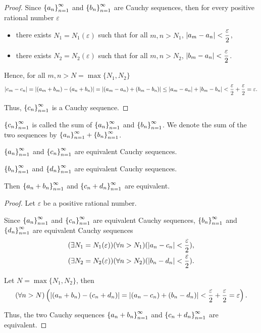 \begin{proof}
    Since ${\left\{{a_{n}}\right\}}^{\infty}_{n=1}$ and ${\left\{{b_{n}}\right\}}^{\infty}_{n=1}$ are Cauchy sequences, then for every positive rational number $\varepsilon$
    \begin{itemize}[itemsep=0pt]
        \item there exists $N_{1} = N_{1}(\varepsilon)$ such that for all $m, n > N_{1}$, $\left\vert{a_{m} - a_{n}}\right\vert < \dfrac{\varepsilon}{2}$,
        \item there exists $N_{2} = N_{2}(\varepsilon)$ such that for all $m, n > N_{2}$, $\left\vert{b_{m} - a_{n}}\right\vert < \dfrac{\varepsilon}{2}$.
    \end{itemize}

    Hence, for all $m, n > N = \max\{N_{1}, N_{2}\}$
    \[
        \left\vert{c_{m} - c_{n}}\right\vert = \left\vert{(a_{m} + b_{m}) - (a_{n} + b_{n})}\right\vert = \left\vert{(a_{m} - a_{n}) + (b_{m} - b_{n})}\right\vert\le \left\vert{a_{m} - a_{n}}\right\vert + \left\vert{b_{m} - b_{n}}\right\vert < \frac{\varepsilon}{2} + \frac{\varepsilon}{2} = \varepsilon.
    \]

    Thus, ${\left\{{c_{n}}\right\}}^{\infty}_{n=1}$ is a Cauchy sequence.
\end{proof}

${\left\{{c_{n}}\right\}}^{\infty}_{n=1}$ is called the sum of ${\left\{{a_{n}}\right\}}^{\infty}_{n=1}$ and ${\left\{{b_{n}}\right\}}^{\infty}_{n=1}$. We denote the sum of the two sequences by ${\left\{{a_{n}}\right\}}^{\infty}_{n=1} + {\left\{{b_{n}}\right\}}^{\infty}_{n=1}$.

\begin{theorem}
    ${\left\{{a_{n}}\right\}}^{\infty}_{n=1}$ and ${\left\{{c_{n}}\right\}}^{\infty}_{n=1}$ are equivalent Cauchy sequences.

    ${\left\{{b_{n}}\right\}}^{\infty}_{n=1}$ and ${\left\{{d_{n}}\right\}}^{\infty}_{n=1}$ are equivalent Cauchy sequences.

    Then ${\left\{{a_{n} + b_{n}}\right\}}^{\infty}_{n=1}$ and ${\left\{{c_{n} + d_{n}}\right\}}^{\infty}_{n=1}$ are equivalent.
\end{theorem}

\begin{proof}
    Let $\varepsilon$ be a positive rational number.

    Since ${\left\{{a_{n}}\right\}}^{\infty}_{n=1}$ and ${\left\{{c_{n}}\right\}}^{\infty}_{n=1}$ are equivalent Cauchy sequences, ${\left\{{b_{n}}\right\}}^{\infty}_{n=1}$ and ${\left\{{d_{n}}\right\}}^{\infty}_{n=1}$ are equivalent Cauchy sequences
    \[
        \begin{split}
            (\exists N_{1} = N_{1}(\varepsilon))(\forall n > N_{1})(\left\vert{a_{n} - c_{n}}\right\vert < \frac{\varepsilon}{2}), \\
            (\exists N_{2} = N_{2}(\varepsilon))(\forall n > N_{2})(\left\vert{b_{n} - d_{n}}\right\vert < \frac{\varepsilon}{2}).
        \end{split}
    \]

    Let $N = \max\{ N_{1}, N_{2} \}$, then
    \[
        (\forall n > N)\left(\left\vert{(a_{n} + b_{n}) - (c_{n} + d_{n})}\right\vert = \left\vert{(a_{n} - c_{n}) + (b_{n} - d_{n})}\right\vert < \frac{\varepsilon}{2} + \frac{\varepsilon}{2} = \varepsilon\right).
    \]

    Thus, the two Cauchy sequences ${\left\{{a_{n} + b_{n}}\right\}}^{\infty}_{n=1}$ and ${\left\{{c_{n} + d_{n}}\right\}}^{\infty}_{n=1}$ are equivalent.
\end{proof}

